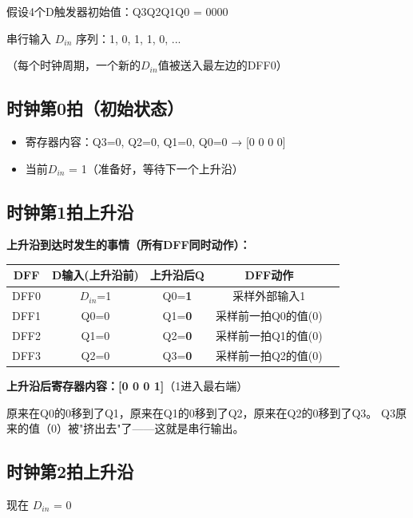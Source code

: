 假设4个D触发器初始值：Q3Q2Q1Q0 = 0000

串行输入 $D_{in}$ 序列：1, 0, 1, 1, 0, ...

（每个时钟周期，一个新的$D_{in}$值被送入最左边的DFF0）

\subsection{时钟第0拍（初始状态）}

\begin{itemize}
  \item 寄存器内容：Q3=0, Q2=0, Q1=0, Q0=0 → [0 0 0 0]
  \item 当前$D_{in}$ = 1（准备好，等待下一个上升沿）
\end{itemize}

\subsection{时钟第1拍上升沿}

\begin{beatanalysis}
\textbf{上升沿到达时发生的事情（所有DFF同时动作）：}

\begin{center}
\begin{tabular}{|c|c|c|c|c|}
\hline
\textbf{DFF} & \textbf{D输入(上升沿前)} & \textbf{上升沿后Q} & \textbf{DFF动作} \\
\hline
DFF0 & $D_{in}$=1 & Q0=\textbf{1} & 采样外部输入1 \\
DFF1 & Q0=0 & Q1=\textbf{0} & 采样前一拍Q0的值(0) \\
DFF2 & Q1=0 & Q2=\textbf{0} & 采样前一拍Q1的值(0) \\
DFF3 & Q2=0 & Q3=\textbf{0} & 采样前一拍Q2的值(0) \\
\hline
\end{tabular}

\textbf{上升沿后寄存器内容：[0 0 0 1]}（1进入最右端）

原来在Q0的0移到了Q1，原来在Q1的0移到了Q2，原来在Q2的0移到了Q3。
Q3原来的值（0）被"挤出去"了——这就是串行输出。
\end{center}
\end{beatanalysis}

\subsection{时钟第2拍上升沿}

现在 $D_{in}$ = 0

